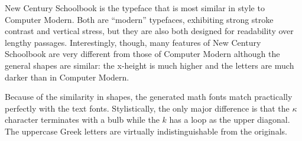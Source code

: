 
New Century Schoolbook is the typeface that is most similar in style to Computer
Modern. Both are ``modern'' typefaces, exhibiting strong stroke contrast and
vertical stress, but they are also both designed for readability over lengthy
passages. Interestingly, though, many features of New Century Schoolbook are
very different from those of Computer Modern although the general shapes are
similar: the x-height is much higher and the letters are much darker than in
Computer Modern.

Because of the similarity in shapes, the generated math fonts match practically
perfectly with the text fonts. Stylistically, the only major difference is that
the $\kappa$ character terminates with a bulb while the $k$ has a loop as the
upper diagonal. The uppercase Greek letters are virtually indistinguishable from
the originals.
